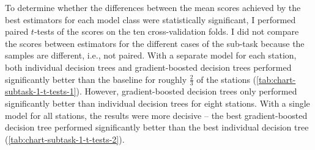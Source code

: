 \documentclass[11pt]{extarticle}
\begin{document}
To determine whether the differences between the mean scores achieved by the best
estimators for each model class were statistically significant, I performed paired
$t$-tests of the scores on the ten cross-validation folds.
I did not compare the scores between estimators for the different cases of the sub-task
because the samples are different, i.e., not paired.
With a separate model for each station, both individual decision trees and
gradient-boosted decision trees performed significantly better than the baseline for
roughly $\frac{2}{3}$ of the stations (\cref{tab:chart-subtask-1-t-tests-1}).
However, gradient-boosted decision trees only performed significantly better than
individual decision trees for eight stations.
With a single model for all stations, the results were more decisive -- the best
gradient-boosted decision tree performed significantly better than the best individual
decision tree (\cref{tab:chart-subtask-1-t-tests-2}).
\end{document}
